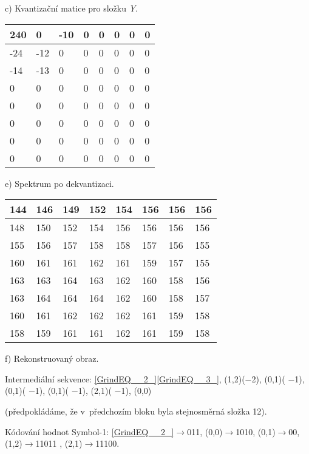c) Kvantizační matice pro složku \textit{Y}.

\begin{tabular}{|p{0.2in}|p{0.2in}|p{0.2in}|p{0.2in}|p{0.2in}|p{0.2in}|p{0.2in}|p{0.2in}|} \hline 
240 & 0 & -10 & 0 & 0 & 0 & 0 & 0 \\ \hline 
-24 & -12 & 0 & 0 & 0 & 0 & 0 & 0 \\ \hline 
-14 & -13 & 0 & 0 & 0 & 0 & 0 & 0 \\ \hline 
0 & 0 & 0 & 0 & 0 & 0 & 0 & 0 \\ \hline 
0 & 0 & 0 & 0 & 0 & 0 & 0 & 0 \\ \hline 
0 & 0 & 0 & 0 & 0 & 0 & 0 & 0 \\ \hline 
0 & 0 & 0 & 0 & 0 & 0 & 0 & 0 \\ \hline 
0 & 0 & 0 & 0 & 0 & 0 & 0 & 0 \\ \hline 
\end{tabular}

e) Spektrum po dekvantizaci.

\begin{tabular}{|p{0.2in}|p{0.2in}|p{0.2in}|p{0.2in}|p{0.2in}|p{0.2in}|p{0.2in}|p{0.2in}|} \hline 
144 & 146 & 149 & 152 & 154 & 156 & 156 & 156 \\ \hline 
148 & 150 & 152 & 154 & 156 & 156 & 156 & 156 \\ \hline 
155 & 156 & 157 & 158 & 158 & 157 & 156 & 155 \\ \hline 
160 & 161 & 161 & 162 & 161 & 159 & 157 & 155 \\ \hline 
163 & 163 & 164 & 163 & 162 & 160 & 158 & 156 \\ \hline 
163 & 164 & 164 & 164 & 162 & 160 & 158 & 157 \\ \hline 
160 & 161 & 162 & 162 & 162 & 161 & 159 & 158 \\ \hline 
158 & 159 & 161 & 161 & 162 & 161 & 159 & 158 \\ \hline 
\end{tabular}

f) Rekonstruovaný obraz.

\noindent 

\noindent Intermediální sekvence: \eqref{GrindEQ__2_}\eqref{GrindEQ__3_}, (1,2)($-$2), (0,1)( $-$1), (0,1)( $-$1), (0,1)( $-$1), (2,1)( $-$1), (0,0)

\noindent (předpokládáme, že v~předchozím bloku byla stejnosměrná složka 12).

\noindent Kódování hodnot Symbol-1: \eqref{GrindEQ__2_}$\rightarrow$011, (0,0)$\rightarrow$1010, (0,1)$\rightarrow$00, (1,2)$\rightarrow$11011 , (2,1)$\rightarrow$11100.

